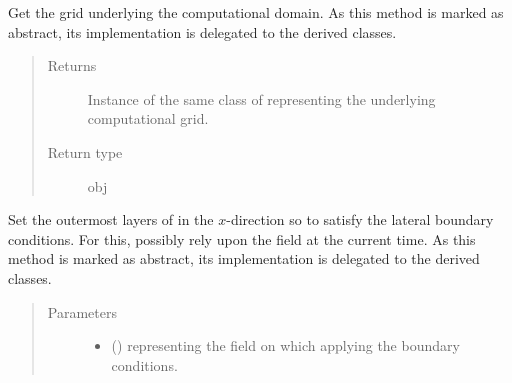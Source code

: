 \documentclass[letterpaper,10pt,english]{sphinxmanual}
\begin{document}
\begin{fulllineitems}
\begin{fulllineitems}
\end{fulllineitems}


\begin{fulllineitems}
\label{\detokenize{api:dycore.horizontal_boundary.HorizontalBoundary.get_computational_grid}}
Get the  grid underlying the computational domain.
As this method is marked as abstract, its implementation is delegated to the derived classes.
\begin{quote}\begin{description}
\item[{Returns}] \leavevmode
Instance of the same class of 
representing the underlying computational grid.

\item[{Return type}] \leavevmode
obj

\end{description}\end{quote}

\end{fulllineitems}


\begin{fulllineitems}
\label{\detokenize{api:dycore.horizontal_boundary.HorizontalBoundary.set_outermost_layers_x}}
Set the outermost layers of  in the \(x\)-direction so to satisfy
the lateral boundary conditions. For this, possibly rely upon the field  at the current time.
As this method is marked as abstract, its implementation is delegated to the derived classes.
\begin{quote}\begin{description}
\item[{Parameters}] \leavevmode\begin{itemize}
\item {} 
 () \textendash{}  representing the field on which applying the boundary conditions.


\end{itemize}
\end{description}
\end{quote}
\end{fulllineitems}
\end{fulllineitems}
\end{document}
